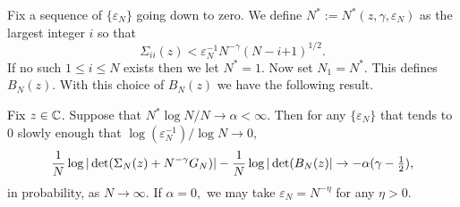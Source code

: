 \documentclass{amsart}
\numberwithin{equation}{section}
\def\corA{}
\def\corAB{}
\def\corABrev{\textcolor{black}}
\begin{document}
Fix a sequence of $\{\varepsilon_N\}$ going down to zero.
We define $N^*:=N^*(z,\gamma,\varepsilon_N)$ as the largest integer $i$ so that
\begin{equation}\label{eq:N*-dfn}
  \Sigma_{ii}(z) < \corA{\varepsilon_N^{-1}} N^{-\gamma}(N-i\corAB{+1})^{1/2}.
\end{equation}
If no such $1 \leq i \leq N$ exists
then
we let $N^*=1$. Now set $N_1 = N^*$. This defines $B_N(z)$. With this choice of $B_N(z)$ we have the following result.

\begin{theorem} \label{thm:logdet}
\corABrev{Fix $z \in \mathbb{C}$.} Suppose that $N^* \log N / N \to \alpha < \infty.$  Then for any $\{\varepsilon_N\}$ that tends to $0$ slowly enough that $\log(\varepsilon_N^{-1})/\log N \to 0,$
  \begin{equation}\label{eq:log-det-conv}
    \frac{1}{N} \log| \det( \Sigma_N(z) + N^{-\gamma}G_N)|
    -
    \frac{1}{N} \log| \det( B_N(z)|
    \to  -\alpha(\gamma - \tfrac{1}{2}),
  \end{equation}
in probability, as $N\to\infty$. If $\alpha = 0,$ we may take $\varepsilon_N = N^{-\eta}$ for any $\eta > 0.$
\end{theorem}

\end{document}
